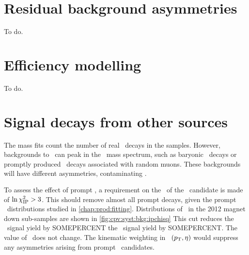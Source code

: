 \begin{table}
  \centering
  \caption{%
    Differences between asymmetries measured with the nominal fit method and 
    the sideband subtraction, measured for each data sub-sample and combination 
    of sub-samples.
    The uncertainties quoted assume the values found by the two methods are 
    fully correlated.
    The computation of the combinations, ``2011 + 2012'' and ``Average'', is 
    defined in \cref{chap:cpv:results:combination}.
  }
  \label{tab:syst:sbs_differences}
    
\end{table}

\section{Residual background asymmetries}
\label{chap:cpv:syst:asym}

To do.

\section{Efficiency modelling}
\label{chap:cpv:syst:eff}

To do.

\section{Signal decays from other sources}
\label{chap:cpv:syst:bkg}

The mass fits count the number of real \PLambdac\ decays in the samples.
However, backgrounds to \LbToLcmuX\ can peak in the \PLambdac\ mass spectrum, 
such as baryonic \PB\ decays or promptly produced \PLambdac\ decays associated 
with random muons.
These backgrounds will have different asymmetries, contaminating \dACP\@.

To assess the effect of prompt \PLambdac, a requirement on the \ipchisq\ of the 
\PLambdac\ candidate is made of $\ln\chi^2_{\textnormal{IP}} > 3$.
This should remove almost all prompt decays, given the prompt \lnipchisq\ 
distributions studied in \cref{chap:prod:fitting}.
Distributions of \lnipchisq\ in the 2012 magnet down sub-samples are shown in 
\cref{fig:cpv:syst:bkg:ipchisq}
This cut reduces the \pKK\ signal yield by SOMEPERCENT the \ppipi\ signal yield 
by SOMEPERCENT\@.
The value of \dACP\ does not change.
The kinematic weighting in \PLambdac\ $(p_{\textnormal{T}}, \eta)$ would suppress any 
asymmetries arising from prompt \PLambdac\ candidates.

